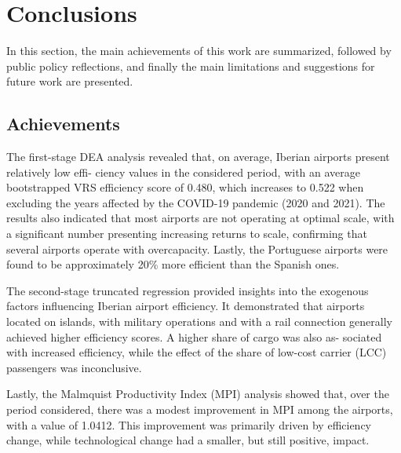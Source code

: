 
\section{Conclusions}
\label{sec:concl}
In this section, the main achievements of this work are summarized, followed by public policy reflections, and finally the main limitations and suggestions for future work are presented.
\subsection{Achievements}

The first-stage DEA analysis revealed that, on average, Iberian airports present relatively low effi-
ciency values in the considered period, with an average bootstrapped VRS efficiency score of 0.480, which increases to 0.522 when excluding the years affected by the COVID-19 pandemic (2020 and
2021). The results also indicated that most airports are not operating at optimal scale, with a significant
number presenting increasing returns to scale, confirming that several airports operate with overcapacity. Lastly, the Portuguese airports were found to be approximately
20\% more efficient than the Spanish ones.

The second-stage truncated regression provided insights into the exogenous factors influencing
Iberian airport efficiency. It demonstrated that airports located on islands, with military operations and
with a rail connection generally achieved higher efficiency scores. A higher share of cargo was also as-
sociated with increased efficiency, while the effect of the share of low-cost carrier (LCC) passengers was
inconclusive.

Lastly, the Malmquist Productivity Index (MPI) analysis showed that, over the period considered,
there was a modest improvement in MPI among the airports, with a value of 1.0412. This improvement
was primarily driven by efficiency change, while technological change had a smaller, but still positive,
impact.


